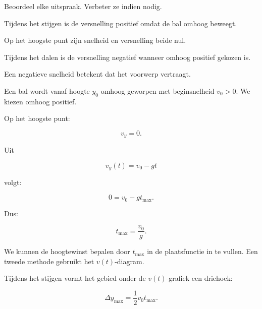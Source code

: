 \documentclass{ximera}
\begin{document}
\begin{oefening}[Misconcepten]{\oefU\ESS}

Beoordeel elke uitspraak. Verbeter ze indien nodig.

\begin{question}
Tijdens het stijgen is de versnelling positief omdat de bal omhoog beweegt.
\end{question}

\begin{question}
Op het hoogste punt zijn snelheid en versnelling beide nul.
\end{question}

\begin{question}
Tijdens het dalen is de versnelling negatief wanneer omhoog positief gekozen is.
\end{question}

\begin{question}
Een negatieve snelheid betekent dat het voorwerp vertraagt.
\end{question}

\end{oefening}




Een bal wordt vanaf hoogte $y_0$ omhoog geworpen met beginsnelheid
$v_0>0$. We kiezen omhoog positief.



Op het hoogste punt:

\[
v_y=0.
\]

Uit

\[
v_y(t)=v_0-gt
\]

volgt:

\[
0=v_0-gt_{\max}.
\]

Dus:

\[
\boxed{
t_{\max}=\frac{v_0}{g}.
}
\]



We kunnen de hoogtewinst bepalen door $t_{\max}$ in de plaatsfunctie
in te vullen. Een tweede methode gebruikt het $v(t)$-diagram.

Tijdens het stijgen vormt het gebied onder de $v(t)$-grafiek een
driehoek:

\[
\Delta y_{\max}
=
\frac12 v_0t_{\max}.
\]
\end{document}
